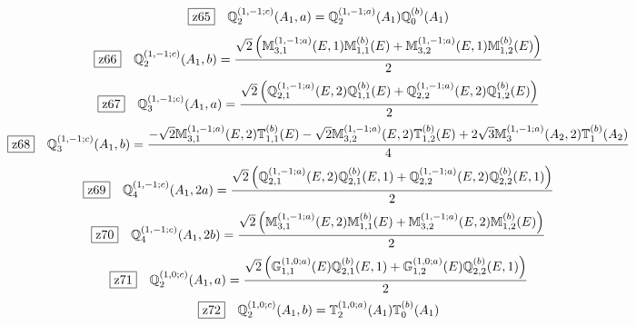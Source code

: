 \documentclass[fleqn,10pt,landscape]{jsarticle}
\begin{document}
\begin{dmath*}
\hspace*{3mm}\fbox{z65}\quad \mathbb{Q}_{2}^{(1,-1;c)}(A_{1},a)=\mathbb{Q}_{2}^{(1,-1;a)}(A_{1}) \mathbb{Q}_{0}^{(b)}(A_{1})
\end{dmath*}
\begin{dmath*}
\hspace*{3mm}\fbox{z66}\quad \mathbb{Q}_{2}^{(1,-1;c)}(A_{1},b)=\frac{\sqrt{2} \left(\mathbb{M}_{3,1}^{(1,-1;a)}(E,1) \mathbb{M}_{1,1}^{(b)}(E) + \mathbb{M}_{3,2}^{(1,-1;a)}(E,1) \mathbb{M}_{1,2}^{(b)}(E)\right)}{2}
\end{dmath*}
\begin{dmath*}
\hspace*{3mm}\fbox{z67}\quad \mathbb{Q}_{3}^{(1,-1;c)}(A_{1},a)=\frac{\sqrt{2} \left(\mathbb{Q}_{2,1}^{(1,-1;a)}(E,2) \mathbb{Q}_{1,1}^{(b)}(E) + \mathbb{Q}_{2,2}^{(1,-1;a)}(E,2) \mathbb{Q}_{1,2}^{(b)}(E)\right)}{2}
\end{dmath*}
\begin{dmath*}
\hspace*{3mm}\fbox{z68}\quad \mathbb{Q}_{3}^{(1,-1;c)}(A_{1},b)=\frac{- \sqrt{2} \mathbb{M}_{3,1}^{(1,-1;a)}(E,2) \mathbb{T}_{1,1}^{(b)}(E) - \sqrt{2} \mathbb{M}_{3,2}^{(1,-1;a)}(E,2) \mathbb{T}_{1,2}^{(b)}(E) + 2 \sqrt{3} \mathbb{M}_{3}^{(1,-1;a)}(A_{2},2) \mathbb{T}_{1}^{(b)}(A_{2})}{4}
\end{dmath*}
\begin{dmath*}
\hspace*{3mm}\fbox{z69}\quad \mathbb{Q}_{4}^{(1,-1;c)}(A_{1},2a)=\frac{\sqrt{2} \left(\mathbb{Q}_{2,1}^{(1,-1;a)}(E,2) \mathbb{Q}_{2,1}^{(b)}(E,1) + \mathbb{Q}_{2,2}^{(1,-1;a)}(E,2) \mathbb{Q}_{2,2}^{(b)}(E,1)\right)}{2}
\end{dmath*}
\begin{dmath*}
\hspace*{3mm}\fbox{z70}\quad \mathbb{Q}_{4}^{(1,-1;c)}(A_{1},2b)=\frac{\sqrt{2} \left(\mathbb{M}_{3,1}^{(1,-1;a)}(E,2) \mathbb{M}_{1,1}^{(b)}(E) + \mathbb{M}_{3,2}^{(1,-1;a)}(E,2) \mathbb{M}_{1,2}^{(b)}(E)\right)}{2}
\end{dmath*}
\begin{dmath*}
\hspace*{3mm}\fbox{z71}\quad \mathbb{Q}_{2}^{(1,0;c)}(A_{1},a)=\frac{\sqrt{2} \left(\mathbb{G}_{1,1}^{(1,0;a)}(E) \mathbb{Q}_{2,1}^{(b)}(E,1) + \mathbb{G}_{1,2}^{(1,0;a)}(E) \mathbb{Q}_{2,2}^{(b)}(E,1)\right)}{2}
\end{dmath*}
\begin{dmath*}
\hspace*{3mm}\fbox{z72}\quad \mathbb{Q}_{2}^{(1,0;c)}(A_{1},b)=\mathbb{T}_{2}^{(1,0;a)}(A_{1}) \mathbb{T}_{0}^{(b)}(A_{1})
\end{dmath*}
\end{document}
